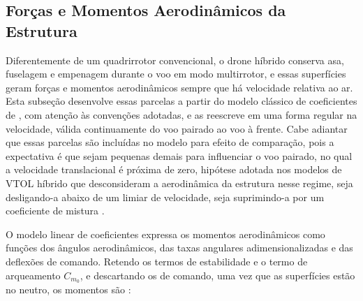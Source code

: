 {\color{blue}
\subsection[{\color{blue}Forças e Momentos Aerodinâmicos da Estrutura}]{Forças e Momentos Aerodinâmicos da Estrutura}
\label{sec:aero-estrutura}

Diferentemente de um quadrirrotor convencional, o drone híbrido conserva asa, fuselagem e empenagem durante o voo em modo multirrotor, e essas superfícies geram forças e momentos aerodinâmicos sempre que há velocidade relativa ao ar. Esta subseção desenvolve essas parcelas a partir do modelo clássico de coeficientes de \textcite{Beard2012}, com atenção às convenções adotadas, e as reescreve em uma forma regular na velocidade, válida continuamente do voo pairado ao voo à frente. Cabe adiantar que essas parcelas são incluídas no modelo para efeito de comparação, pois a expectativa é que sejam pequenas demais para influenciar o voo pairado, no qual a velocidade translacional é próxima de zero, hipótese adotada nos modelos de VTOL híbrido que desconsideram a aerodinâmica da estrutura nesse regime, seja desligando-a abaixo de um limiar de velocidade, seja suprimindo-a por um coeficiente de mistura \cite{Graesdal2021, Hu2024, Salahudden2023}.

O modelo linear de coeficientes expressa os momentos aerodinâmicos como funções dos ângulos aerodinâmicos, das taxas angulares adimensionalizadas e das deflexões de comando. Retendo os termos de estabilidade e o termo de arqueamento $C_{m_0}$, e descartando os de comando, uma vez que as superfícies estão no neutro, os momentos são \cite[Eqs. 4.5, 4.15 e 4.16]{Beard2012}:

}
